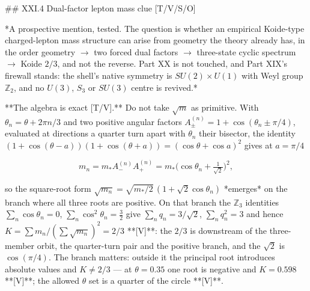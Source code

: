 ## XXI.4 Dual-factor lepton mass clue [T/V/S/O]

*A prospective mention, tested. The question is whether an empirical Koide-type charged-lepton mass structure can arise from geometry the theory already has, in the order geometry $\to$ two forced dual factors $\to$ three-state cyclic spectrum $\to$ Koide $2/3$, and not the reverse. Part XX is not touched, and Part XIX's firewall stands: the shell's native symmetry is $SU(2)\times U(1)$ with Weyl group $\mathbb Z_2$, and no $U(3)$, $S_3$ or $SU(3)$ centre is revived.*

**The algebra is exact [T/V].** Do not take $\sqrt m$ as primitive. With $\theta_n = \theta+2\pi n/3$ and two positive angular factors $A_\pm^{(n)} = 1+\cos(\theta_n\pm\pi/4)$, evaluated at directions a quarter turn apart with $\theta_n$ their bisector, the identity $(1+\cos(\theta-a))(1+\cos(\theta+a)) = (\cos\theta+\cos a)^2$ gives at $a = \pi/4$

$$m_n = m_*A_-^{(n)}A_+^{(n)} = m_*\Big(\cos\theta_n+\tfrac1{\sqrt2}\Big)^2,$$

so the square-root form $\sqrt{m_n} = \sqrt{m_*/2}\,(1+\sqrt2\cos\theta_n)$ *emerges* on the branch where all three roots are positive. On that branch the $\mathbb Z_3$ identities $\sum_n\cos\theta_n = 0$, $\sum_n\cos^2\theta_n = \tfrac32$ give $\sum_nq_n = 3/\sqrt2$, $\sum_nq_n^2 = 3$ and hence $K = \sum m_n/(\sum\sqrt{m_n})^2 = 2/3$ **[V]**: the $2/3$ is downstream of the three-member orbit, the quarter-turn pair and the positive branch, and the $\sqrt2$ is $\cos(\pi/4)$. The branch matters: outside it the principal root introduces absolute values and $K\neq2/3$ — at $\theta = 0.35$ one root is negative and $K = 0.598$ **[V]**; the allowed $\theta$ set is a quarter of the circle **[V]**.

